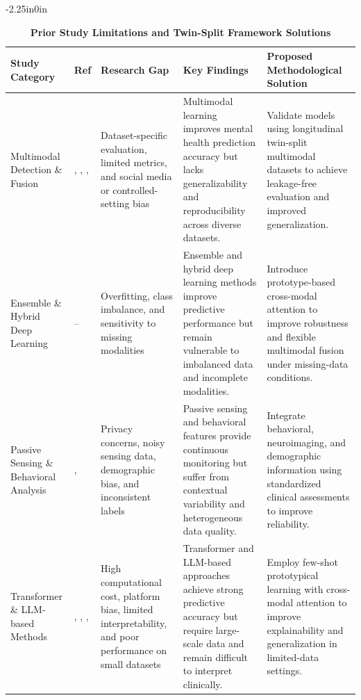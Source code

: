 \documentclass[10pt,letterpaper]{article}
\begin{document}
\begin{table}[!t]
\begin{adjustwidth}{-2.25in}{0in}
\centering
\caption{\textbf{Prior Study Limitations and Twin-Split Framework Solutions}}
\label{tab:prior_limitations}
\footnotesize
\renewcommand{\arraystretch}{1.15}

\begin{tabular}{|p{2.8cm}|p{2.0cm}|p{3.8cm}|p{4.5cm}|p{4.8cm}|}
\hline
\textbf{Study Category} & \textbf{Ref} & \textbf{Research Gap} & \textbf{Key Findings} & \textbf{Proposed Methodological Solution} \\
\hline

Multimodal Detection \& Fusion
& \cite{ref1}, \cite{ref2}, \cite{ref3}, \cite{ref4}
& Dataset-specific evaluation, limited metrics, and social media or controlled-setting bias
& Multimodal learning improves mental health prediction accuracy but lacks generalizability and reproducibility across diverse datasets.
& Validate models using longitudinal twin-split multimodal datasets to achieve leakage-free evaluation and improved generalization. \\
\hline

Ensemble \& Hybrid Deep Learning
& \cite{ref5}--\cite{ref8}
& Overfitting, class imbalance, and sensitivity to missing modalities
& Ensemble and hybrid deep learning methods improve predictive performance but remain vulnerable to imbalanced data and incomplete modalities.
& Introduce prototype-based cross-modal attention to improve robustness and flexible multimodal fusion under missing-data conditions. \\
\hline

Passive Sensing \& Behavioral Analysis
& \cite{ref9}, \cite{ref12}
& Privacy concerns, noisy sensing data, demographic bias, and inconsistent labels
& Passive sensing and behavioral features provide continuous monitoring but suffer from contextual variability and heterogeneous data quality.
& Integrate behavioral, neuroimaging, and demographic information using standardized clinical assessments to improve reliability. \\
\hline

Transformer \& LLM-based Methods
& \cite{ref16}, \cite{ref17}, \cite{ref20}, \cite{ref21}
& High computational cost, platform bias, limited interpretability, and poor performance on small datasets
& Transformer and LLM-based approaches achieve strong predictive accuracy but require large-scale data and remain difficult to interpret clinically.
& Employ few-shot prototypical learning with cross-modal attention to improve explainability and generalization in limited-data settings. \\
\hline


\end{tabular}
\end{adjustwidth}
\end{table}
\end{document}
